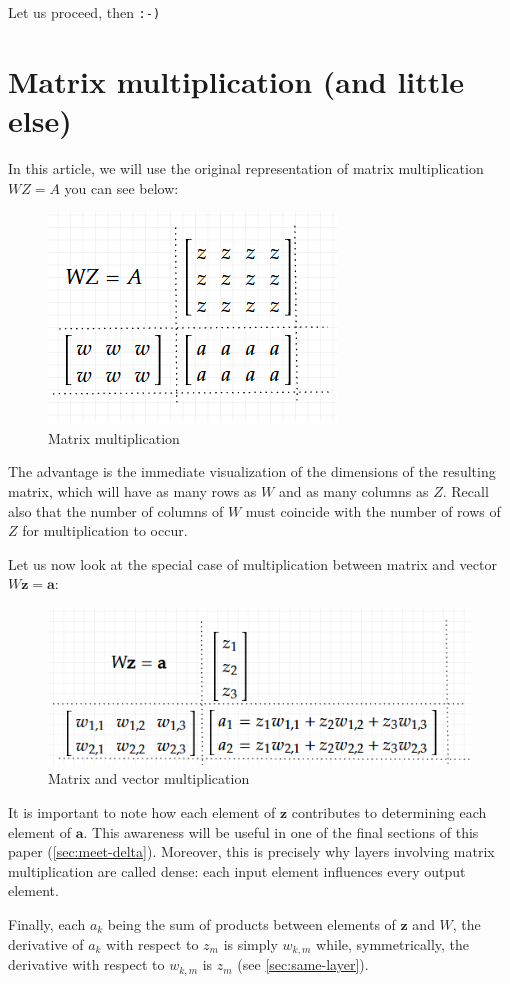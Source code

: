 \documentclass{article}
\begin{document}
Let us proceed, then \verb|:-)|


\section{Matrix multiplication (and little else)}\label{sec:matrix}
In this article, we will use the original representation of matrix multiplication $WZ=A$ you can see below:

\begin{figure}[H]
    \centering
    \includegraphics[width=0.3\linewidth]{images/matrix.png}
    \caption{Matrix multiplication}
\end{figure}

The advantage is the immediate visualization of the dimensions of the resulting matrix, which will have as many rows as $W$ and as many columns as $Z$. Recall also that the number of columns of $W$ must coincide with the number of rows of $Z$ for multiplication to occur.

Let us now look at the special case of multiplication between matrix and vector $W\boldsymbol{z}=\boldsymbol{a}$:

\begin{figure}[H]
    \centering
    \includegraphics[width=0.5\linewidth]{images/matrix-vector.png}
    \caption{Matrix and vector multiplication}
    \label{fig:enter-label}
\end{figure}

It is important to note how each element of $\boldsymbol{z}$ contributes to determining each element of $\boldsymbol{a}$. This awareness will be useful in one of the final sections of this paper (\ref{sec:meet-delta}). Moreover, this is precisely why layers involving matrix multiplication are called dense: each input element influences every output element.

Finally, each $a_k$ being the sum of products between elements of $\boldsymbol{z}$ and $W$, the derivative of $a_k$ with respect to $z_m$ is simply $w_{k,m}$ while, symmetrically, the derivative with respect to $w_{k,m}$ is $z_m$ (see \ref{sec:same-layer}).
\end{document}

